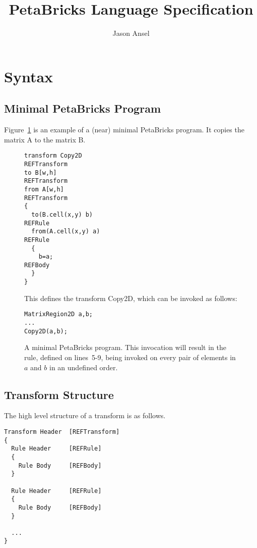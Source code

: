 \documentclass[11pt]{article}
\begin{document}
\title{PetaBricks Language Specification}
\author{Jason Ansel}
\maketitle
\tableofcontents

\newpage
\section{Syntax}

\subsection{Minimal PetaBricks Program}

Figure~\ref{ex1} is an example of a (near) minimal PetaBricks program. It
copies the matrix A to the matrix B.

\begin{figure}
\begin{lstlisting}
transform Copy2D                                                 REFTransform
to B[w,h]                                                        REFTransform
from A[w,h]                                                      REFTransform
{
  to(B.cell(x,y) b)                                              REFRule
  from(A.cell(x,y) a)                                            REFRule  
  {                                          
    b=a;                                                         REFBody
  }                                         
}
\end{lstlisting}
This defines the transform Copy2D, which can be invoked as follows:

\begin{lstlisting}
MatrixRegion2D a,b;
...
Copy2D(a,b);
\end{lstlisting}
  \caption{
  A minimal PetaBricks program.  This invocation will result in the rule,
  defined on lines~5-9, being invoked on every pair of elements in $a$
  and $b$ in an undefined order.
  \label{ex1}
  }
\end{figure}


\subsection{Transform Structure}

The high level structure of a transform is as follows.

\begin{lstlisting}
Transform Header  [REFTransform]
{
  Rule Header     [REFRule] 
  {                       
    Rule Body     [REFBody]
  }                      
  
  Rule Header     [REFRule] 
  {                       
    Rule Body     [REFBody]
  }                                         

  ...
}
\end{lstlisting}
\end{document}
